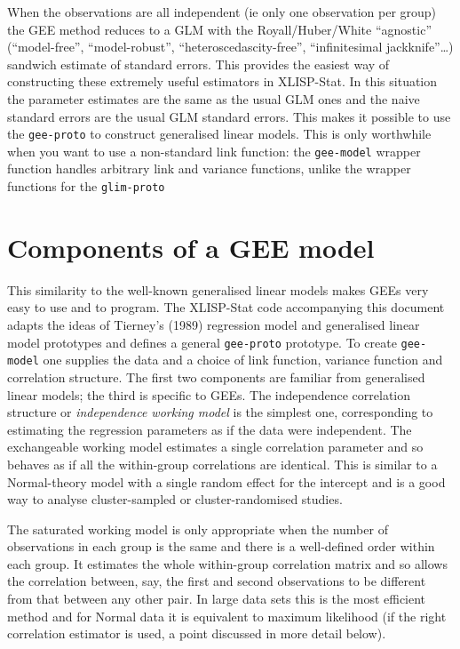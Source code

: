 \documentclass[10pt]{article}
\begin{document}
When the observations are all independent (ie only one observation per group) the GEE method reduces to a GLM with the  Royall/Huber/White ``agnostic'' (``model-free'', ``model-robust'', ``heteroscedascity-free'', ``infinitesimal jackknife''\ldots) sandwich estimate of standard errors.  This provides the easiest way of constructing these extremely useful estimators in XLISP-Stat.  In this situation the parameter estimates are the same as the usual GLM ones and the naive standard errors are the usual GLM standard errors.  This makes it possible to use the \texttt{gee-proto} to construct generalised linear models. This is only worthwhile when you want to use a non-standard link function: the \texttt{gee-model} wrapper function handles arbitrary link and variance functions, unlike the wrapper functions for the \texttt{glim-proto}

\section{Components of a GEE model}
This similarity to the well-known generalised linear models makes GEEs very easy to use and to program.  The XLISP-Stat code  accompanying this document adapts the ideas of Tierney's (1989) regression model and generalised linear model prototypes  and defines a general \texttt{gee-proto} prototype. To create \texttt{gee-model} one supplies the data and a choice of link function, variance function and correlation structure.  The first two components are familiar from generalised linear models; the third is specific to GEEs. The independence correlation structure or \emph{independence working model} is the simplest one, corresponding to estimating the regression parameters as if the data were independent. The exchangeable working model estimates a single correlation parameter and so behaves as if all the within-group correlations are identical.  This is similar to a Normal-theory model with a single random effect for the intercept and is a good way to analyse cluster-sampled or cluster-randomised studies.
 
The saturated working model is only appropriate when the number of observations in each group is the same and there is a well-defined order within each group. It estimates the whole within-group correlation matrix and so allows the correlation between, say,  the first and second observations to be different from that between any other pair.  In large data sets this is the most efficient method and for Normal data it is equivalent to maximum likelihood (if the right correlation estimator is used, a point discussed in more detail below).
\end{document}
